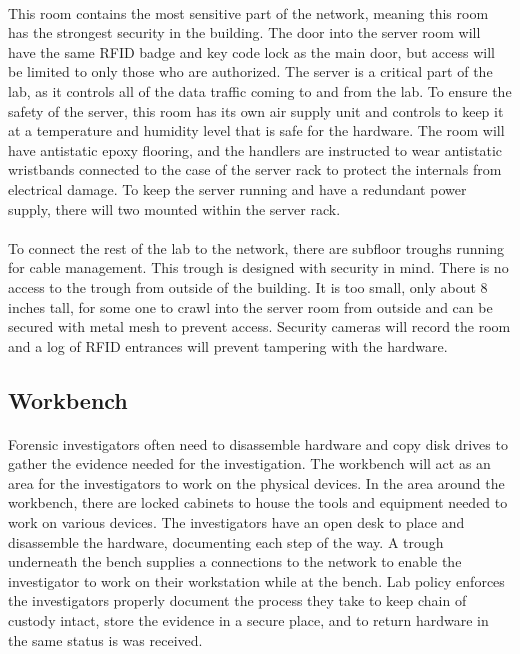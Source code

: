 \documentclass[12pt]{article}
\begin{document}
\paragraph{}
This room contains the most sensitive part of the network, meaning this room has the strongest security in the building.
The door into the server room will have the same RFID badge and key code lock as the main door, but access will be limited to only those who are authorized.
The server is a critical part of the lab, as it controls all of the data traffic coming to and from the lab.
To ensure the safety of the server, this room has its own air supply unit and controls to keep it at a temperature and humidity level that is safe for the hardware.
The room will have antistatic epoxy flooring, and the handlers are instructed to wear antistatic wristbands connected to the case of the server rack to protect the internals from electrical damage.
To keep the server running and have a redundant power supply, there will two mounted within the server rack.
\paragraph{}
To connect the rest of the lab to the network, there are subfloor troughs running for cable management.
This trough is designed with security in mind.
There is no access to the trough from outside of the building.
It is too small, only about 8 inches tall, for some one to crawl into the server room from outside and can be secured with metal mesh to prevent access.
Security cameras will record the room and a log of RFID entrances will prevent tampering with the hardware.
\subsection{Workbench}
\paragraph{}
Forensic investigators often need to disassemble hardware and copy disk drives to gather the evidence needed for the investigation.
The workbench will act as an area for the investigators to work on the physical devices.
In the area around the workbench, there are locked cabinets to house the tools and equipment needed to work on various devices.
The investigators have an open desk to place and disassemble the hardware, documenting each step of the way.
A trough underneath the bench supplies a connections to the network to enable the investigator to work on their workstation while at the bench.
Lab policy enforces the investigators properly document the process they take to keep chain of custody intact, store the evidence in a secure place, and to return hardware in the same status is was received.
\end{document}

